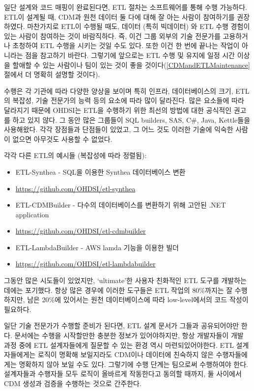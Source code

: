 \documentclass[11pt]{book}
\providecommand{\tightlist}{%
  \setlength{\itemsep}{0pt}\setlength{\parskip}{0pt}}
\theoremstyle{definition}
\theoremstyle{definition}
\theoremstyle{definition}
\theoremstyle{remark}
\begin{document}
일단 설계와 코드 매핑이 완료된다면, ETL 절차는 소프트웨어를 통해 수행
가능하다. ETL이 설계될 때, CDM과 원천 데이터 둘 다에 대해 잘 아는 사람이
참여하기를 권장하였다. 마찬가지로 ETL이 수행될 때도, 데이터 (특히
빅데이터) 와 ETL 수행 경험이 있는 사람이 참여하는 것이 바람직하다. 즉,
이건 그룹 외부의 기술 전문가를 고용하거나 초청하여 ETL 수행을 시키는
것일 수도 있다. 또한 이건 한 번에 끝나는 작업이 아니라는 점을 참고하기
바란다. 그렇기에 앞으로는 ETL 수행 및 유지에 일정 시간 이상을 할애할 수
있는 사람이나 팀이 있는 것이 좋을
것이다(\ref{CDMandETLMaintenance}절에서 더 명확히 설명할 것이다).

수행은 각 기관에 따라 다양한 양상을 보이며 특히 인프라, 데이터베이스의
크기, ETL의 복잡성, 기술 전문가의 능력 등의 요소에 따라 많이 달라진다.
많은 요소들에 따라 달라지기 때문에 OHDSI는 ETL을 수행하기 위한 최선의
방법에 대한 공식적인 권고를 하고 있지 않다. 그 동안 많은 그룹들이 SQL
builders, SAS, C\#, Java, Kettle들을 사용해왔다. 각각 장점들과 단점들이
있었고, 그 어느 것도 이러한 기술에 익숙한 사람이 없으면 아무것도 사용할
수 없었다.

각각 다른 ETL의 예시들 (복잡성에 따라 정렬됨):

\begin{itemize}
\tightlist
\item
  ETL-Synthea - SQL을 이용한 Synthea 데이터베이스 변환
\item
  \url{https://github.com/OHDSI/etl-synthea}
\item
  ETL-CDMBuilder - 다수의 데이터베이스를 변환하기 위해 고안된 .NET
  application
\item
  \url{https://github.com/OHDSI/etl-cdmbuilder}
\item
  ETL-LambdaBuilder - AWS lamda 기능을 이용한 빌더
\item
  \url{https://github.com/OHDSI/etl-lambdabuilder}
\end{itemize}

그동안 많은 시도들이 있었지만, `ultimate'한 사용자 친화적인 ETL 도구를
개발하는데에는 포기했다. 항상 많은 경우에 이러한 도구들은 ETL 작업의
80\%까지는 잘 수행하지만, 남은 20\%에 있어서는 원천 데이터베이스에 따라
low-level에서의 코드 작성이 필요하다.

일단 기술 전문가가 수행할 준비가 된다면, ETL 설계 문서가 그들과
공유되어야만 한다. 문서에는 수행을 시작할만한 충분한 정보가
있어야하지만, 항상 개발자들이 개발 과정 중에 ETL 설계자들에게 질문할 수
있는 환경 역시 마련되있어야한다. ETL 설계자들에게는 로직이 명확해
보일지라도 CDM이나 데이터에 친숙하지 않은 수행자들에게는 명확하지 않아
보일 수도 있다. 그렇기에 수행 단계는 팀으로써 수행하여야 한다.
설계자들과 수행자들 모두 로직이 올바르게 작동한다고 동의할 때까지, 둘
사이에서 CDM 생성과 검증을 수행하는 것으로 간주한다.
\end{document}
